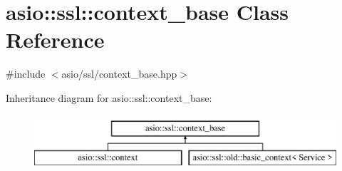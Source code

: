 \hypertarget{classasio_1_1ssl_1_1context__base}{}\section{asio\+:\+:ssl\+:\+:context\+\_\+base Class Reference}
\label{classasio_1_1ssl_1_1context__base}


{\ttfamily \#include $<$asio/ssl/context\+\_\+base.\+hpp$>$}

Inheritance diagram for asio\+:\+:ssl\+:\+:context\+\_\+base\+:\begin{figure}[H]
\begin{center}
\leavevmode
\includegraphics[height=2.000000cm]{classasio_1_1ssl_1_1context__base}
\end{center}
\end{figure}
